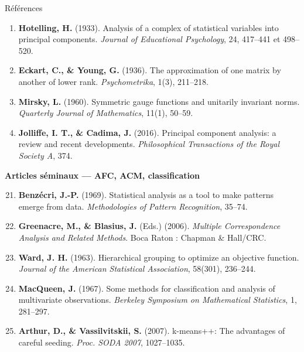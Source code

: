 \begin{frame}[allowframebreaks]{Références}
\begin{enumerate}
  \item \textbf{Hotelling, H.} (1933).
        Analysis of a complex of statistical variables into principal components.
        \textit{Journal of Educational Psychology}, 24, 417--441 et 498--520.

  \item \textbf{Eckart, C., \& Young, G.} (1936).
        The approximation of one matrix by another of lower rank.
        \textit{Psychometrika}, 1(3), 211--218.

  \item \textbf{Mirsky, L.} (1960).
        Symmetric gauge functions and unitarily invariant norms.
        \textit{Quarterly Journal of Mathematics}, 11(1), 50--59.

  \item \textbf{Jolliffe, I. T., \& Cadima, J.} (2016).
        Principal component analysis: a review and recent developments.
        \textit{Philosophical Transactions of the Royal Society A}, 374.
\end{enumerate}

\framebreak

\textbf{\large Articles séminaux — AFC, ACM, classification}\\[6pt]

\begin{enumerate}
  \setcounter{enumi}{20}
  \item \textbf{Benzécri, J.-P.} (1969).
        Statistical analysis as a tool to make patterns emerge from data.
        \textit{Methodologies of Pattern Recognition}, 35--74.

  \item \textbf{Greenacre, M., \& Blasius, J.} (Eds.) (2006).
        \textit{Multiple Correspondence Analysis and Related Methods}.
        Boca Raton : Chapman \& Hall/CRC.

  \item \textbf{Ward, J. H.} (1963).
        Hierarchical grouping to optimize an objective function.
        \textit{Journal of the American Statistical Association}, 58(301), 236--244.

  \item \textbf{MacQueen, J.} (1967).
        Some methods for classification and analysis of multivariate observations.
        \textit{Berkeley Symposium on Mathematical Statistics}, 1, 281--297.

  \item \textbf{Arthur, D., \& Vassilvitskii, S.} (2007).
        k-means++: The advantages of careful seeding.
        \textit{Proc. SODA 2007}, 1027--1035.


\end{enumerate}
\end{frame}
